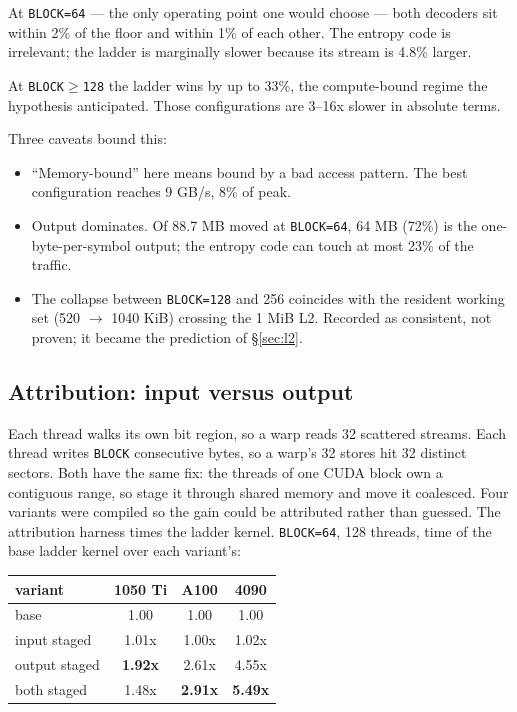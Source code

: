 \documentclass[11pt,a4paper]{article}
\newcommand{\code}[1]{\texttt{#1}}
\newcommand{\B}[1]{\textbf{#1}}
\begin{document}
At \code{BLOCK=64} --- the only operating point one would choose --- both decoders sit within 2\% of the floor and within 1\% of each other. The entropy code is irrelevant; the ladder is marginally slower because its stream is 4.8\% larger.

At \code{BLOCK$\geq$128} the ladder wins by up to 33\%, the compute-bound regime the hypothesis anticipated. Those configurations are 3--16x slower in absolute terms.

Three caveats bound this:
\begin{itemize}
\item ``Memory-bound'' here means bound by a bad access pattern. The best configuration reaches 9 GB/s, 8\% of peak.
\item Output dominates. Of 88.7 MB moved at \code{BLOCK=64}, 64 MB (72\%) is the one-byte-per-symbol output; the entropy code can touch at most 23\% of the traffic.
\item The collapse between \code{BLOCK=128} and 256 coincides with the resident working set (520 $\rightarrow$ 1040 KiB) crossing the 1 MiB L2. Recorded as consistent, not proven; it became the prediction of \S\ref{sec:l2}.
\end{itemize}

\subsection{Attribution: input versus output}\label{sec:attr}

Each thread walks its own bit region, so a warp reads 32 scattered streams. Each thread writes \code{BLOCK} consecutive bytes, so a warp's 32 stores hit 32 distinct sectors. Both have the same fix: the threads of one CUDA block own a contiguous range, so stage it through shared memory and move it coalesced. Four variants were compiled so the gain could be attributed rather than guessed. The attribution harness times the ladder kernel. \code{BLOCK=64}, 128 threads, time of the base ladder kernel over each variant's:

\begin{center}
\begin{tabular}{@{}lccc@{}}
\toprule
variant & 1050 Ti & A100 & 4090 \\
\midrule
base & 1.00 & 1.00 & 1.00 \\
input staged & 1.01x & 1.00x & 1.02x \\
output staged & \B{1.92x} & 2.61x & 4.55x \\
both staged & 1.48x & \B{2.91x} & \B{5.49x} \\
\bottomrule
\end{tabular}
\end{center}
\end{document}
